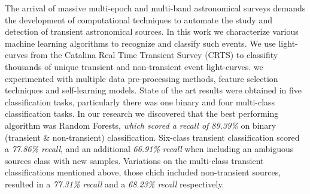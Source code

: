 

The arrival of massive multi-epoch and multi-band astronomical surveys
demands the development of computational techniques to automate the
study and detection of transient astronomical sources. 
In this work we characterize various machine learning algorithms to
recognize and classify such events.
We use light-curves from the Catalina Real Time Transient Survey
(CRTS) to classifity thousands of unique transient and non-transient
event light-curves.
we experimented  with multiple data pre-processing methods,
feature selection techniques and self-learning models. State of the
art results were obtained in five classification tasks, particularly
there was one binary and four multi-class classification tasks. In our
research we discovered that the best performing algorithm was Random
Forests, \textit{which scored a recall of 89.39\%} on binary
(transient \& non-transient) classification. Six-class transient
classification scored a \textit{77.86\% recall}, and an
additional \textit{66.91\% recall} when including an ambiguous sources
class with new samples. Variations on the multi-class transient
classifications mentioned above, those chich included non-transient
sources, resulted in a \textit{77.31\% recall} and a \textit{68.23\%
recall} respectively.   
